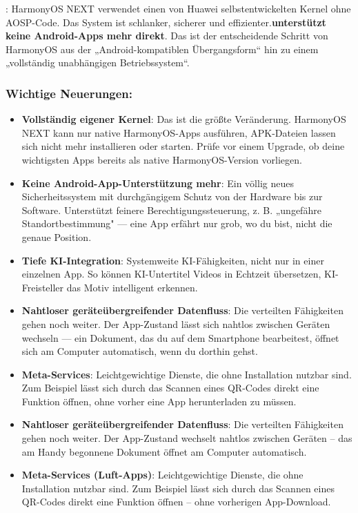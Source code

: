
: HarmonyOS NEXT verwendet einen von Huawei selbstentwickelten Kernel ohne AOSP-Code. Das System ist schlanker, sicherer und effizienter.\textbf{unterstützt keine Android-Apps mehr direkt}. Das ist der entscheidende Schritt von HarmonyOS aus der „Android-kompatiblen Übergangsform“ hin zu einem „vollständig unabhängigen Betriebssystem“.

\subsubsection*{Wichtige Neuerungen:}

\begin{itemize}
  \item \textbf{Vollständig eigener Kernel}: Das ist die größte Veränderung. HarmonyOS NEXT kann nur native HarmonyOS-Apps ausführen, APK-Dateien lassen sich nicht mehr installieren oder starten. Prüfe vor einem Upgrade, ob deine wichtigsten Apps bereits als native HarmonyOS-Version vorliegen.
  \item \textbf{Keine Android-App-Unterstützung mehr}: Ein völlig neues Sicherheitssystem mit durchgängigem Schutz von der Hardware bis zur Software. Unterstützt feinere Berechtigungssteuerung, z. B. „ungefähre Standortbestimmung" — eine App erfährt nur grob, wo du bist, nicht die genaue Position.
  \item \textbf{Tiefe KI-Integration}: Systemweite KI-Fähigkeiten, nicht nur in einer einzelnen App. So können KI-Untertitel Videos in Echtzeit übersetzen, KI-Freisteller das Motiv intelligent erkennen.
  \item \textbf{Nahtloser geräteübergreifender Datenfluss}: Die verteilten Fähigkeiten gehen noch weiter. Der App-Zustand lässt sich nahtlos zwischen Geräten wechseln — ein Dokument, das du auf dem Smartphone bearbeitest, öffnet sich am Computer automatisch, wenn du dorthin gehst.
  \item \textbf{Meta-Services}: Leichtgewichtige Dienste, die ohne Installation nutzbar sind. Zum Beispiel lässt sich durch das Scannen eines QR-Codes direkt eine Funktion öffnen, ohne vorher eine App herunterladen zu müssen.
  \item \textbf{Nahtloser geräteübergreifender Datenfluss}: Die verteilten Fähigkeiten gehen noch weiter. Der App-Zustand wechselt nahtlos zwischen Geräten – das am Handy begonnene Dokument öffnet am Computer automatisch.
  \item \textbf{Meta-Services (Luft-Apps)}: Leichtgewichtige Dienste, die ohne Installation nutzbar sind. Zum Beispiel lässt sich durch das Scannen eines QR-Codes direkt eine Funktion öffnen – ohne vorherigen App-Download.
\end{itemize}

